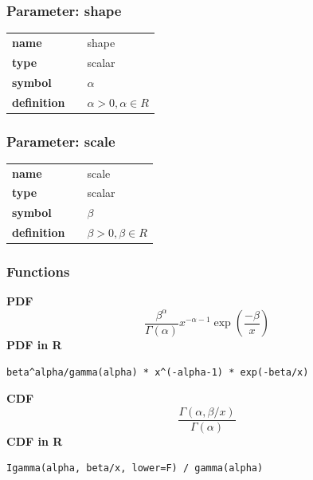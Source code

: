 \subsubsection*{Parameter: shape}

\noindent\begin{tabular}{p{2cm}cl}
\textbf{name} & & shape \\
\textbf{type} & & scalar \\
\textbf{symbol} & & $\alpha$  \\
\textbf{definition} & & $\alpha>0, \alpha \in  R$
\end{tabular}
\subsubsection*{Parameter: scale}

\noindent\begin{tabular}{p{2cm}cl}
\textbf{name} & & scale \\
\textbf{type} & & scalar \\
\textbf{symbol} & & $\beta$  \\
\textbf{definition} & & $\beta>0, \beta \in  R$
\end{tabular}
\subsubsection*{Functions}

\smallskip \noindent \hspace{.2cm} \textbf{PDF} 
\begin{equation*}\frac{\beta^\alpha}{\Gamma(\alpha)} x^{-\alpha - 1} \exp \left(\frac{-\beta}{x}\right)\end{equation*}
\smallskip \noindent \hspace{.2cm} \textbf{PDF in R}  
\begin{verbatim}beta^alpha/gamma(alpha) * x^(-alpha-1) * exp(-beta/x)\end{verbatim}
\smallskip \noindent \hspace{.2cm} \textbf{CDF} 
\begin{equation*}\frac{\Gamma(\alpha, \beta/x)}{\Gamma(\alpha)}\end{equation*}
\smallskip \noindent \hspace{.2cm} \textbf{CDF in R} 
\begin{verbatim}Igamma(alpha, beta/x, lower=F) / gamma(alpha)\end{verbatim}
\smallskip
